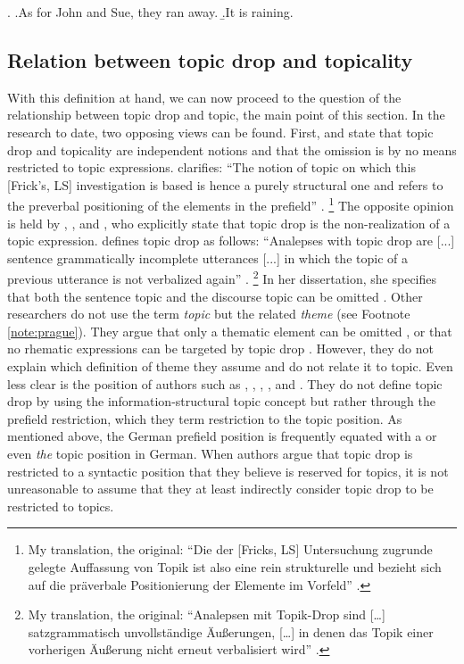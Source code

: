 \ex.
\a.As for John and Sue, they ran away.\label{ex:multiple.topics}
\b.It is raining.\label{ex:thetic}


\subsection{Relation between topic drop and topicality}\label{sec:topicality.relation}
With this definition at hand, we can now proceed to the question of the relationship between topic drop and topic, the main point of this section.
In the research to date, two opposing views can be found.
First, \citet[19]{trutkowski2016} and \citet[67]{frick2017} state that topic drop and topicality are independent notions and that the omission is by no means restricted to topic expressions.
\citet{frick2017} clarifies:
``The notion of topic on which this [Frick's, LS] investigation is based is hence a purely structural one and refers to the preverbal positioning of the elements in the prefield'' \citep[67]{frick2017}.%
\footnote{My translation, the original: ``Die der [Fricks, LS] Untersuchung zugrunde gelegte Auffassung von Topik ist also eine rein strukturelle und bezieht sich auf die präverbale Positionierung der Elemente im Vorfeld'' \citep[67]{frick2017}.}
%
The opposite opinion is held by \citet{sternefeld1985}, \citet{erteschik-shir2007}, and \citet{helmer2016, helmer2017}, who explicitly state that topic drop is the non-realization of a topic expression.
\citet{helmer2017} defines topic drop as follows:
``Analepses with topic drop are [...] sentence grammatically incomplete utterances [...] in which the topic of a previous utterance is not verbalized again'' \citep[2]{helmer2017}.%
\footnote{My translation, the original: ``Analepsen mit Topik-Drop sind […] satzgrammatisch unvollständige Äußerungen, […] in denen das Topik einer vorherigen Äußerung nicht erneut verbalisiert wird'' \citep[2]{helmer2017}.}
%
In her dissertation, she specifies that both the sentence topic and the discourse topic  can be omitted \citep[168]{helmer2016}.
Other researchers do not use the term \textit{topic} but the related \textit{theme} (see Footnote \ref{note:prague}).
They argue that only a thematic element can be omitted \citep{oppenrieder1987, poitou1993, zifonun.etal1997, sandig2000, guenthner2006}, or that no rhematic expressions can be targeted by topic drop \citep{fries1988,zifonun.etal1997}.
However, they do not explain which definition of theme they assume and do not relate it to topic. 
Even less clear is the position of authors such as \citet{huang1984}, \citet{fries1988}, \citet{auer1993}, \citet{jaensch2005}, and \citet{volodina2011}.
They do not define topic drop by using the information-structural topic concept but rather through the prefield restriction, which they term restriction to the topic position.
As mentioned above, the German  prefield position is frequently equated with a or even \textit{the} topic position in German.
When authors argue that topic drop is restricted to a syntactic position that they believe is reserved for topics, it is not unreasonable to assume that they at least indirectly consider topic drop to be restricted to topics.

